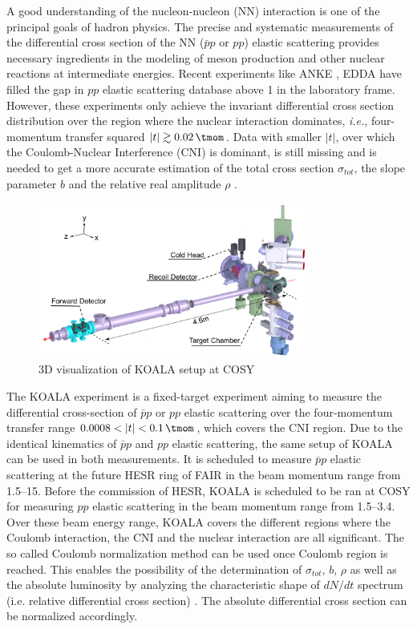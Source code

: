 \documentclass[number,5p]{elsarticle}
\begin{document}
A good understanding of the nucleon-nucleon (NN) interaction is one of the principal goals of hadron physics.
The precise and systematic measurements of the differential cross section of the
NN ($\bar{p}p$ or $pp$) elastic scattering provides necessary ingredients
in the modeling of meson production and other nuclear reactions at intermediate energies.
Recent experiments like ANKE \cite{ANKE}, EDDA \cite{EDDA} have filled the gap
in $pp$ elastic scattering database above \SI{1}{\momentum} in the laboratory frame.
However, these experiments only achieve the invariant differential cross section distribution over the region where the nuclear interaction dominates, 
\textit{i.e.}, four-momentum transfer squared $|t| \gtrsim \SI{0.02}{\tmom}$.
Data with smaller \(|t|\), over which the Coulomb-Nuclear Interference (CNI) is
dominant, is still missing and is needed to get a more accurate estimation of
the total cross section \({\sigma}_{tot}\), the slope parameter \(b\) and the
relative real amplitude \(\rho\) \cite{RevModPhys.57.563}.

\begin{figure}[htbp]
	\centering
	\includegraphics[width=0.8\textwidth]{./koala_setup.png}
	\caption{3D visualization of KOALA setup at COSY}
	\label{fig:setup}
\end{figure}

The KOALA experiment is a fixed-target experiment aiming to measure the
differential cross-section of $\bar{p}p$ or $pp$ elastic scattering
over the four-momentum transfer range $0.0008 < |t| < \SI{0.1}{\tmom}$, which
covers the CNI region.
Due to the identical kinematics of $\bar{p}p$ and $pp$ elastic scattering, the
same setup of KOALA can be used in both measurements.
It is scheduled to measure $\bar{p}p$ elastic
scattering at the future HESR ring of FAIR \cite{FAIR} in the beam momentum range from
\SIrange{1.5}{15}{\momentum}.
Before the commission of HESR, KOALA is scheduled to be ran at COSY \cite{COSY}
for measuring $pp$ elastic scattering in the beam momentum range from \SIrange{1.5}{3.4}{\momentum}.
Over these beam energy range, KOALA covers the different regions where the Coulomb interaction, the CNI and the nuclear interaction are all significant.
The so called Coulomb normalization method \cite{bernard1987real,jenni2008atlas} can be used once Coulomb region is reached.
This enables the possibility of the determination of \({\sigma}_{tot}\), \(b\), \(\rho\) as well as
the absolute luminosity by analyzing the characteristic shape of $dN/dt$
spectrum (i.e. relative differential cross section) \cite{recoil_article}.
The absolute differential cross section can be normalized accordingly.
\end{document}
